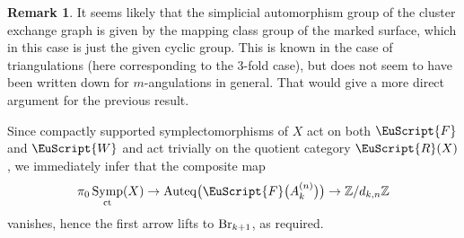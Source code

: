 \documentclass[10pt,a4paper]{amsart}
\DeclareMathOperator{\Auteq}{Auteq}
\def\scrR{\EuScript{R}}
\newcommand{\scrF}{\EuScript{F}}
\def\scrW{\EuScript{W}}
\DeclareMathOperator{\Symp}{Symp}
\def\bZ{\mathbb{Z}}
\theoremstyle{definition}
\newtheorem{rmk}[thm]{Remark}
\numberwithin{equation}{section}
\begin{document}
\begin{rmk}
 It seems likely that the simplicial automorphism group of the cluster exchange graph is given by the mapping class group of the marked surface, which in this case is just the given cyclic group. This is known in the case of triangulations (here corresponding to the 3-fold case), but does not seem to have been written down for $m$-angulations in general. That would give a more direct argument for the previous result.
\end{rmk}

Since compactly supported symplectomorphisms of $X$ act on both $\scrF$ and $\scrW$ and act trivially on the quotient category $\scrR(X)$, we immediately infer that the composite map
\[
\pi_0\Symp_{\rm ct}(X) \to \Auteq\bigl(\scrF\bigl(A_k^{(n)}\bigr)\bigr) \to \bZ/d_{k,n}\bZ
\]
vanishes, hence the first arrow lifts to ${\rm Br}_{k+1}$, as required.
\end{document}
